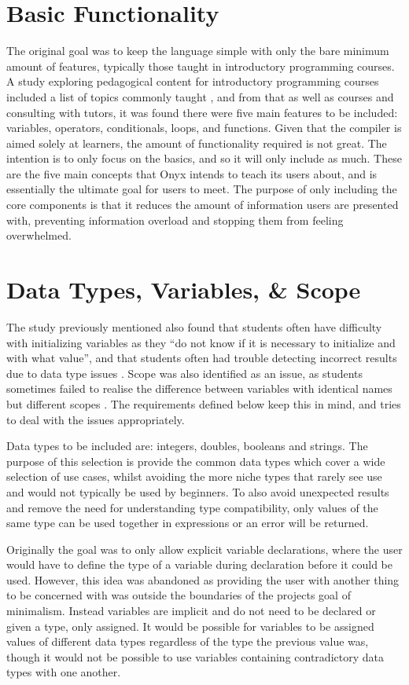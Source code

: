 \documentclass[
]{report}
\begin{document}
\section{Basic Functionality}
The original goal was to keep the language simple with only the bare
minimum amount of features, typically those taught in introductory
programming courses. A study exploring pedagogical content for
introductory programming courses included a list of topics commonly
taught \cite{pedagogical-report}, and from that as well as courses and consulting with
tutors, it was found there were five main features to be included:
variables, operators, conditionals, loops, and functions. Given that the
compiler is aimed solely at learners, the amount of functionality
required is not great. The intention is to only focus on the basics, and
so it will only include as much. These are the five main concepts that
Onyx intends to teach its users about, and is essentially the ultimate
goal for users to meet. The purpose of only including the core
components is that it reduces the amount of information users are
presented with, preventing information overload and stopping them from
feeling overwhelmed.

\section{Data Types, Variables, \& Scope}
The study previously mentioned also found that students often have
difficulty with initializing variables as they ``do not know if it is
necessary to initialize and with what value'', and that students often
had trouble detecting incorrect results due to data type issues
\cite{pedagogical-report}. Scope was also identified as an issue, as students sometimes
failed to realise the difference between variables with identical names
but different scopes \cite{pedagogical-report}. The requirements defined below keep this
in mind, and tries to deal with the issues appropriately.

Data types to be included are: integers, doubles, booleans and strings.
The purpose of this selection is provide the common data types which
cover a wide selection of use cases, whilst avoiding the more niche
types that rarely see use and would not typically be used by beginners.
To also avoid unexpected results and remove the need for understanding
type compatibility, only values of the same type can be used together in
\glspl{expression} or an error will be returned.

Originally the goal was to only allow explicit variable declarations,
where the user would have to define the type of a variable during
declaration before it could be used. However, this idea was abandoned as
providing the user with another thing to be concerned with was outside
the boundaries of the projects goal of minimalism. Instead variables are
implicit and do not need to be declared or given a type, only assigned.
It would be possible for variables to be assigned values of different
data types regardless of the type the previous value was, though it
would not be possible to use variables containing contradictory data
types with one another.
\end{document}
